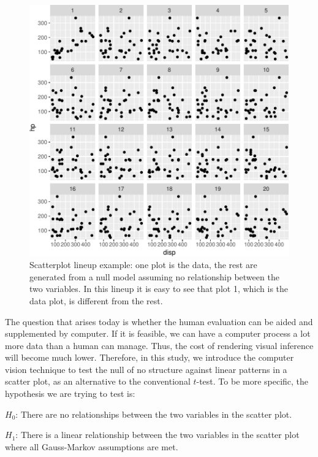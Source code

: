 \documentclass[12pt]{article}
\begin{document}
\begin{figure}
\centering
\includegraphics{pc_plots_files/figure-latex/lineup-1.pdf}
\caption{Scatterplot lineup example: one plot is the data, the rest are
generated from a null model assuming no relationship between the two
variables. In this lineup it is easy to see that plot 1, which is the
data plot, is different from the rest.}
\end{figure}

The question that arises today is whether the human evaluation can be
aided and supplemented by computer. If it is feasible, we can have a
computer process a lot more data than a human can manage. Thus, the cost
of rendering visual inference will become much lower. Therefore, in this
study, we introduce the computer vision technique to test the null of no
structure against linear patterns in a scatter plot, as an alternative
to the conventional \(t\)-test. To be more specific, the hypothesis we
are trying to test is:

\(H_0\): There are no relationships between the two variables in the
scatter plot.

\(H_1\): There is a linear relationship between the two variables in the
scatter plot where all Gauss-Markov assumptions are met.
\end{document}
